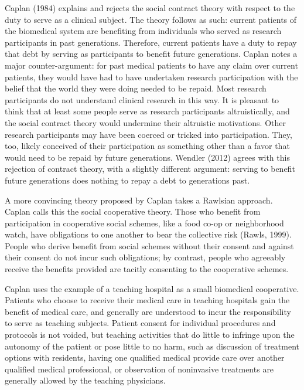 \documentclass[]{spie}  %
\begin{document}
Caplan (1984) explains and rejects the social contract theory with respect to the duty to serve as a clinical subject. The theory follows as such: current patients of the biomedical system are benefiting from individuals who served as research participants in past generations. Therefore, current patients have a duty to repay that debt by serving as participants to benefit future generations. Caplan notes a major counter-argument: for past medical patients to have any claim over current patients, they would have had to have undertaken research participation with the belief that the world they were doing needed to be repaid. Most research participants do not understand clinical research in this way. It is pleasant to think that at least some people serve as research participants altruistically, and the social contract theory would undermine their altruistic motivations. Other research participants may have been coerced or tricked into participation. They, too, likely conceived of their participation as something other than a favor that would need to be repaid by future generations. Wendler (2012) agrees with this rejection of contract theory, with a slightly different argument: serving to benefit future generations does nothing to repay a debt to generations past.

A more convincing theory proposed by Caplan takes a Rawlsian approach. Caplan calls this the social cooperative theory. Those who benefit from participation in cooperative social schemes, like a food co-op or neighborhood watch, have obligations to one another to bear the collective risk (Rawls, 1999). People who derive benefit from social schemes without their consent and against their consent do not incur such obligations; by contrast, people who agreeably receive the benefits provided are tacitly consenting to the cooperative schemes.

Caplan uses the example of a teaching hospital as a small biomedical cooperative. Patients who choose to receive their medical care in teaching hospitals gain the benefit of medical care, and generally are understood to incur the responsibility to serve as teaching subjects. Patient consent for individual procedures and protocols is not voided, but teaching activities that do little to infringe upon the autonomy of the patient or pose little to no harm, such as discussion of treatment options with residents, having one qualified medical provide care over another qualified medical professional, or observation of noninvasive treatments are generally allowed by the teaching physicians.
\end{document}
